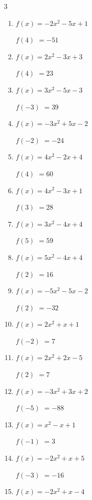 \begin{multicols}{3}
\begin{enumerate}
$f(-3)$
        $= 22$

\columnbreak %

  \item $f(x)=-2x^{2}-5x+1$

$f(4)$
        $= -51$

  \item $f(x)=2x^{2}-3x+3$

$f(4)$
        $= 23$

  \item $f(x)=3x^{2}-5x-3$

$f(-3)$
        $= 39$

  \item $f(x)=-3x^{2}+5x-2$

$f(-2)$
        $= -24$

  \item $f(x)=4x^{2}-2x+4$

$f(4)$
        $= 60$

  \item $f(x)=4x^{2}-3x+1$

$f(3)$
        $= 28$

  \item $f(x)=3x^{2}-4x+4$

$f(5)$
        $= 59$

  \item $f(x)=5x^{2}-4x+4$

$f(2)$
        $= 16$

  \item $f(x)=-5x^{2}-5x-2$

$f(2)$
        $= -32$

  \item $f(x)=2x^{2}+x+1$

$f(-2)$
        $= 7$

  \item $f(x)=2x^{2}+2x-5$

$f(2)$
        $= 7$

  \item $f(x)=-3x^{2}+3x+2$

$f(-5)$
        $= -88$

  \item $f(x)=x^{2}-x+1$

$f(-1)$
        $= 3$

  \item $f(x)=-2x^{2}+x+5$

$f(-3)$
        $= -16$

  \item $f(x)=-2x^{2}+x-4$


\end{enumerate}
\end{multicols}
